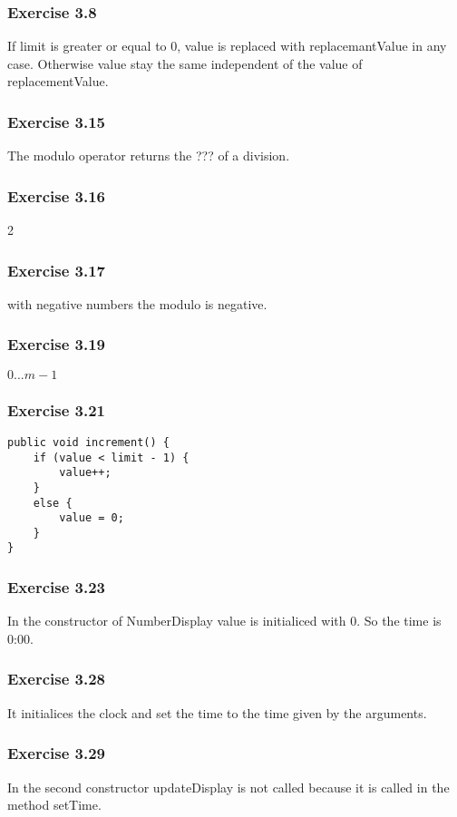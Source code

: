 \subsubsection*{Exercise 3.8}
If limit is greater or equal to 0, value is replaced with replacemantValue in 
any case. Otherwise value stay the same independent of the value of 
replacementValue. 

\subsubsection*{Exercise 3.15}
The modulo operator returns the ??? of a division. 

\subsubsection*{Exercise 3.16}
2

\subsubsection*{Exercise 3.17}
with negative numbers the modulo is negative. 

\subsubsection*{Exercise 3.19}
$0 ... m-1$

\subsubsection*{Exercise 3.21}
\begin{lstlisting}
public void increment() {
    if (value < limit - 1) {
        value++;
    }
    else {
        value = 0;
    }
}
\end{lstlisting}

\subsubsection*{Exercise 3.23}
In the constructor of NumberDisplay value is initialiced with 0. So the time is 
0:00. 

\subsubsection*{Exercise 3.28}
It initialices the clock and set the time to the time given by the arguments. 

\subsubsection*{Exercise 3.29}
In the second constructor updateDisplay is not called because it is called in 
the method setTime. 

